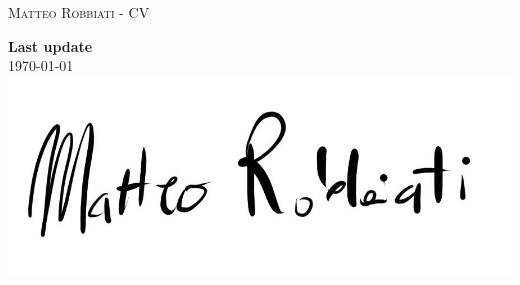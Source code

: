 \documentclass[localFont,alternative]{documentMETADATA}
\begin{document}
	\makecvheader

	\makecvfooter
		{\textsc{}} 
		{\textsc{Matteo Robbiati - CV}}
		{\thepage}

	              
	
	
	
	
    
	
	 
				
	
\vspace{3cm}
\flushright
\textcolor{basecolor}{\textbf{Last update}\\} \monthdayyeardate\today \\
\vspace{0.5cm}
\includegraphics[scale=0.09]{signature.jpg}
\end{document}
